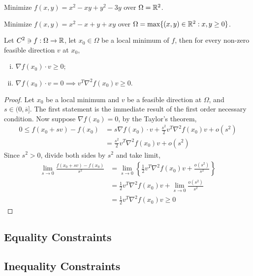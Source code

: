 \documentclass{article}
\begin{document}
   	\begin{example}
   		Minimize $f(x, y)=x^{2}-x y+y^{2}-3 y$ over $\Omega = \mathbb{R}^2$.
   	\end{example}
   	
   	\begin{example}
   		Minimize $f(x, y)=x^{2}-x+y+x y$ over $\Omega = \max\{(x, y) \in \mathbb{R}^2: x, y \geq 0\}$.
   	\end{example}
   	
   	\begin{theorem}
   		Let $C^2 \ni f: \Omega \to \mathbb{R}$, let $x_0 \in \Omega$ be a local minimum of $f$, then for every non-zero feasible direction $v$ at $x_0$,
   		\begin{enumerate}[(i)]
   			\item $\nabla f(x_0) \cdot v \geq 0$;
   			\item $\nabla f(x_0) \cdot v = 0 \implies v^T \nabla^2 f(x_0) v \geq 0$.
   		\end{enumerate}
   	\end{theorem}
   	
   	\begin{proof}
   		Let $x_0$ be a local minimum and $v$ be a feasible direction at $\Omega$, and $s \in (0, \overline{s}]$. The first statement is the immediate result of the first order necessary condition. Now suppose $\nabla f(x_0) = 0$, by the Taylor's theorem,
   		\begin{align}
   			0 \leq f(x_0 + sv) - f(x_0) &= s \nabla f(x_0) \cdot v + \frac{s^2}{2} v^T \nabla^2 f(x_0) v + o(s^2) \\
   			&=\frac{s^2}{2} v^T \nabla^2 f(x_0) v + o(s^2)
   		\end{align}
   		Since $s^2 > 0$, divide both sides by $s^2$ and take limit,
   		\begin{align}
   			\lim_{s \to 0} \frac{f(x_0 + sv) - f(x_0)}{s^2} &= \lim_{s \to 0} 
   			\left \{\frac{1}{2} v^T \nabla^2 f(x_0) v + \frac{o(s^2)}{s^2} \right\}\\
   			&= \frac{1}{2} v^T \nabla^2 f(x_0) v + \lim_{s \to 0} \frac{o(s^2)}{s^2} \\
   			&= \frac{1}{2} v^T \nabla^2 f(x_0) v \geq 0
   		\end{align}
   	\end{proof}
   	
   	\subsection{Equality Constraints}
   	
   	\subsection{Inequality Constraints}
\end{document}
